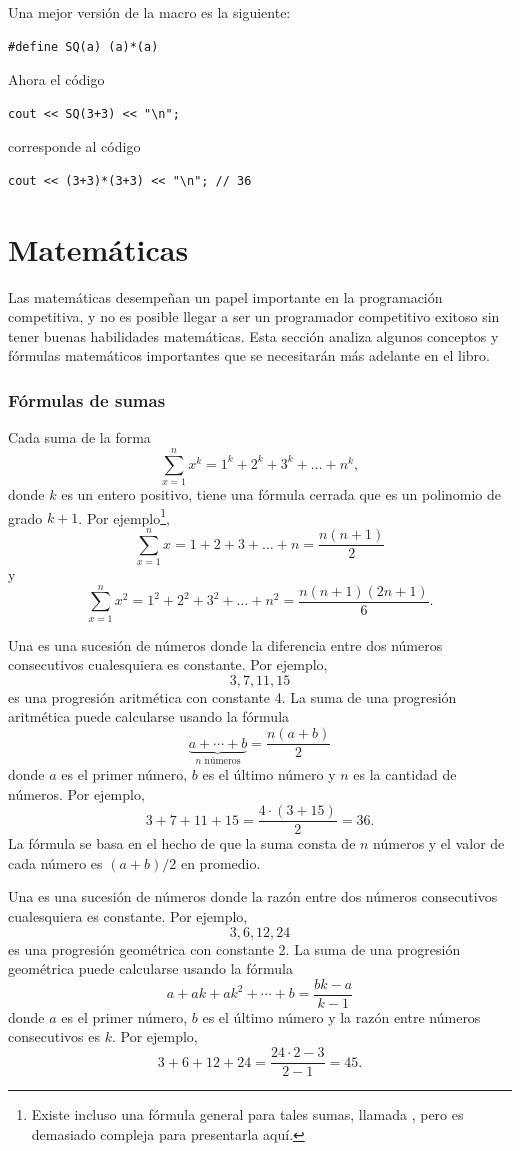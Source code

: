 Una mejor versión de la macro es la siguiente:
\begin{lstlisting}
#define SQ(a) (a)*(a)
\end{lstlisting}
Ahora el código
\begin{lstlisting}
cout << SQ(3+3) << "\n";
\end{lstlisting}
corresponde al código
\begin{lstlisting}
cout << (3+3)*(3+3) << "\n"; // 36
\end{lstlisting}


\section{Matemáticas}

Las matemáticas desempeñan un papel importante en la programación
competitiva, y no es posible llegar a ser
un programador competitivo exitoso sin
tener buenas habilidades matemáticas.
Esta sección analiza algunos conceptos y fórmulas
matemáticos importantes que
se necesitarán más adelante en el libro.

\subsubsection{Fórmulas de sumas}

Cada suma de la forma
\[\sum_{x=1}^n x^k = 1^k+2^k+3^k+\ldots+n^k,\]
donde $k$ es un entero positivo,
tiene una fórmula cerrada que es un
polinomio de grado $k+1$.
Por ejemplo\footnote{
Existe incluso una fórmula general para tales sumas, llamada ,
pero es demasiado compleja para presentarla aquí.},
\[\sum_{x=1}^n x = 1+2+3+\ldots+n = \frac{n(n+1)}{2}\]
y
\[\sum_{x=1}^n x^2 = 1^2+2^2+3^2+\ldots+n^2 = \frac{n(n+1)(2n+1)}{6}.\]

Una  es una 
sucesión de números
donde la diferencia entre dos números consecutivos
cualesquiera es constante.
Por ejemplo,
\[3, 7, 11, 15\]
es una progresión aritmética con constante 4.
La suma de una progresión aritmética puede calcularse
usando la fórmula
\[\underbrace{a + \cdots + b}_{n \,\, \textrm{números}} = \frac{n(a+b)}{2}\]
donde $a$ es el primer número,
$b$ es el último número y
$n$ es la cantidad de números.
Por ejemplo,
\[3+7+11+15=\frac{4 \cdot (3+15)}{2} = 36.\]
La fórmula se basa en el hecho
de que la suma consta de $n$ números y
el valor de cada número es $(a+b)/2$ en promedio.

Una  es una sucesión
de números
donde la razón entre dos números consecutivos
cualesquiera es constante.
Por ejemplo,
\[3,6,12,24\]
es una progresión geométrica con constante 2.
La suma de una progresión geométrica puede calcularse
usando la fórmula
\[a + ak + ak^2 + \cdots + b = \frac{bk-a}{k-1}\]
donde $a$ es el primer número,
$b$ es el último número y la
razón entre números consecutivos es $k$.
Por ejemplo,
\[3+6+12+24=\frac{24 \cdot 2 - 3}{2-1} = 45.\]

